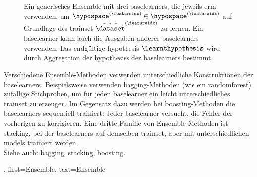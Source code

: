 {{{{{{\begin{figure}[htbp]
\begin{center}
			\caption{Ein generisches Ensemble mit drei \glspl{baselearner}, die jeweils 
				\gls{erm} verwenden, um $\hypospace^{(\featureidx)} \in \hypospace^{(\featureidx)}$ 
				auf Grundlage des \gls{trainset} $\widetilde{\dataset}^{(\featureidx)}$ zu lernen. 
				Ein \gls{baselearner} kann auch die Ausgaben anderer \glspl{baselearner} verwenden. 
				Das endgültige \gls{hypothesis} $\learnthypothesis$ wird durch Aggregation der 
				\glspl{hypothesis} der \glspl{baselearner} bestimmt.}
		\end{center}
	\end{figure}
	Verschiedene Ensemble-Methoden verwenden unterschiedliche Konstruktionen der \glspl{baselearner}. 
	Beispielsweise verwenden \gls{bagging}-Methoden (wie ein \gls{randomforest}) zufällige Stichproben, 
	um für jeden \gls{baselearner} ein leicht unterschiedliches \gls{trainset} zu erzeugen. 
	Im Gegensatz dazu werden bei \gls{boosting}-Methoden die \glspl{baselearner} sequentiell trainiert: 
	Jeder \gls{baselearner} versucht, die Fehler der vorherigen zu korrigieren. Eine dritte Familie von 
	Ensemble-Methoden ist \gls{stacking}, bei der \glspl{baselearner} auf demselben \gls{trainset}, 
	aber mit unterschiedlichen \glspl{model} trainiert werden.\\
	Siehe auch: \gls{bagging}, \gls{stacking}, \gls{boosting}.},
	first={Ensemble},
	text={Ensemble} 
}



}}}}
